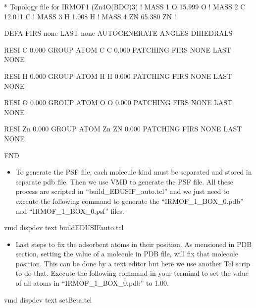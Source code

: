 \documentclass[letterpaper,10pt,english]{sphinxmanual}
\begin{document}
\begin{enumerate}
\begin{itemize}
\end{itemize}

\begin{sphinxVerbatim}[commandchars=\\\{\}]
* Topology file for IRMOF\PYGZhy{}1 (Zn4O(BDC)3)
!
MASS   1  O     15.999      O  !
MASS   2  C     12.011      C  !
MASS   3  H      1.008      H  !
MASS   4  ZN    65.380      ZN !

DEFA FIRS none LAST none
AUTOGENERATE ANGLES DIHEDRALS

RESI    C         0.000
GROUP
ATOM    C   C     0.000
PATCHING FIRS NONE LAST NONE

RESI    H         0.000
GROUP
ATOM    H   H     0.000
PATCHING FIRS NONE LAST NONE

RESI    O          0.000
GROUP
ATOM    O   O      0.000
PATCHING FIRS NONE LAST NONE

RESI    Zn         0.000
GROUP
ATOM    Zn  ZN     0.000
PATCHING FIRS NONE LAST NONE

END
\end{sphinxVerbatim}
\begin{itemize}
\item {} 
To generate the PSF file, each molecule kind must be separated and stored in separate pdb file. Then we use VMD to generate the PSF file.
All these process are scripted in “build\_EDUSIF\_auto.tcl” and we just need to execute the following command to generate the “IRMOF\_1\_BOX\_0.pdb” and
“IRMOF\_1\_BOX\_0.psf” files.

\end{itemize}

\begin{sphinxVerbatim}[commandchars=\\\{\}]
vmd \PYGZhy{}dispdev text \PYGZlt{} build\PYGZus{}EDUSIF\PYGZus{}auto.tcl
\end{sphinxVerbatim}
\begin{itemize}
\item {} 
Last steps to fix the adsorbent atoms in their position. As mensioned in PDB section, setting the  value of a molecule in PDB file, will
fix that molecule position. This can be done by a text editor but here we use another Tcl scrip to do that. Execute the following command in your terminal
to set the  value of all atoms in “IRMOF\_1\_BOX\_0.pdb” to 1.00.

\end{itemize}

\begin{sphinxVerbatim}[commandchars=\\\{\}]
vmd \PYGZhy{}dispdev text \PYGZlt{} setBeta.tcl
\end{sphinxVerbatim}

\end{enumerate}
\end{document}
